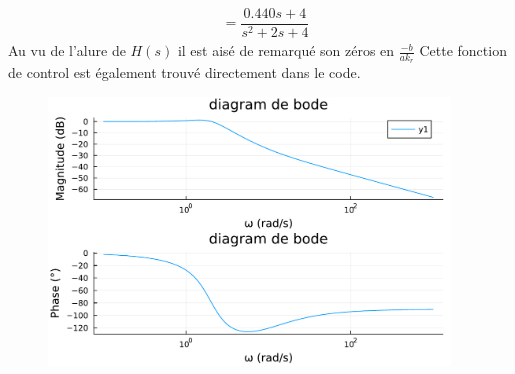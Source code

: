 \documentclass[11pt,a4paper]{article}
\begin{document}
\begin{align*}
	     & = \dfrac{0.440s + 4}{s^2 + 2 s + 4}
\end{align*}
Au vu de l'alure de $H(s)$ il est aisé de remarqué son zéros en $\frac{-b}{a k_r}$
Cette fonction de control est également trouvé directement dans le code.

\begin{figure}[!h]
  \begin{center}
    \includegraphics[width=0.95\textwidth]{../code/jlplots/Q3.pdf}
  \end{center}
  \caption{}\label{fig:bode}
\end{figure}
\end{document}
